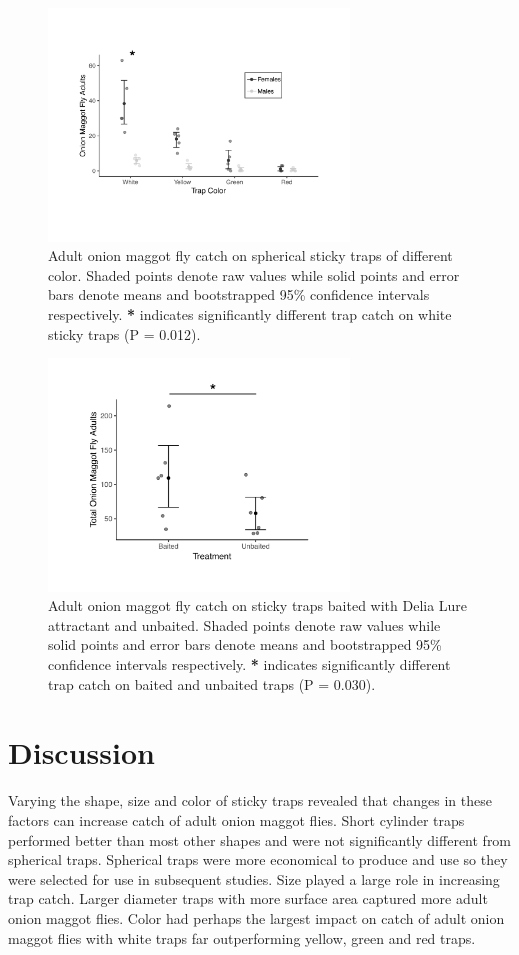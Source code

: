 \documentclass[alpha-refs]{wiley-article}
\begin{document}
\begin{figure}[bt]
\centering
\includegraphics[width = 8cm]{figures/publication/figure-3.pdf}
\caption{Adult onion maggot fly catch on spherical sticky traps of different color.  Shaded points denote raw values while solid points and error bars denote means and bootstrapped 95\% confidence intervals respectively.  \textbf{*} indicates significantly different trap catch on white sticky traps (P = 0.012).}
\label{fig:figure3}
\end{figure}


\begin{figure}[bt]
\centering
\includegraphics[width = 8cm]{figures/publication/figure-4.pdf}
\caption{Adult onion maggot fly catch on sticky traps baited with Delia Lure attractant and unbaited.  Shaded points denote raw values while solid points and error bars denote means and bootstrapped 95\% confidence intervals respectively.  \textbf{*} indicates significantly different trap catch on baited and unbaited traps (P = 0.030). }
\label{fig:figure4}
\end{figure}


\section{Discussion}

Varying the shape, size and color of sticky traps revealed that changes in these factors can increase catch of adult onion maggot flies.  Short cylinder traps performed better than most other shapes and were not significantly different from spherical traps.  Spherical traps were more economical to produce and use so they were selected for use in subsequent studies.  Size played a large role in increasing trap catch.  Larger diameter traps with more surface area captured more adult onion maggot flies.  Color had perhaps the largest impact on catch of adult onion maggot flies with white traps far outperforming yellow, green and red traps.  
\end{document}
